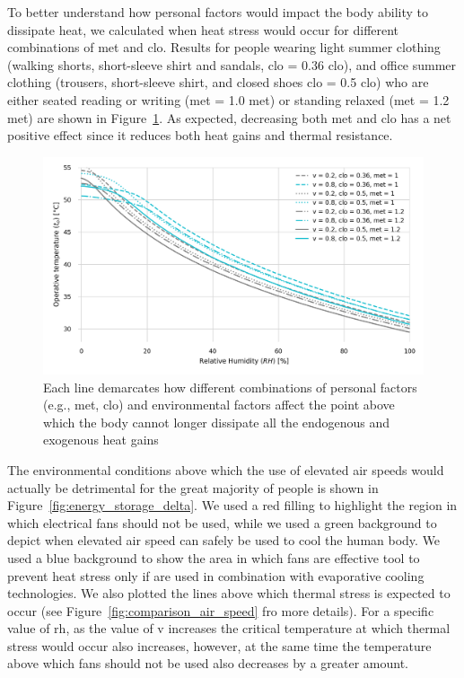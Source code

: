 To better understand how personal factors would impact the body ability to dissipate heat, we calculated when heat stress would occur for different combinations of \ac{met} and \ac{clo}.
Results for people wearing light summer clothing (walking shorts, short-sleeve shirt and sandals, \acs{clo} = 0.36 clo), and office summer clothing (trousers, short-sleeve shirt, and closed shoes \acs{clo} = 0.5 clo) who are either seated reading or writing (\ac{met} = 1.0 met) or standing relaxed (\ac{met} = 1.2 met) are shown in Figure~\ref{fig:met_clo}.
As expected, decreasing both \ac{met} and \ac{clo} has a net positive effect since it reduces both heat gains and thermal resistance.

\begin{figure}[thb!]
    \centering
    \includegraphics[width=\textwidth]{figures/met_clo}
    \caption{Each line demarcates how different combinations of personal factors (e.g., \ac{met}, \ac{clo}) and environmental factors affect the point above which the body cannot longer dissipate all the endogenous and exogenous heat gains}
    \label{fig:met_clo}
\end{figure}

The environmental conditions above which the use of elevated air speeds would actually be detrimental for the great majority of people is shown in Figure~\ref{fig:energy_storage_delta}.
We used a red filling to highlight the region in which electrical fans should not be used, while we used a green background to depict when elevated air speed can safely be used to cool the human body.
We used a blue background to show the area in which fans are effective tool to prevent heat stress only if are used in combination with evaporative cooling technologies.
We also plotted the lines above which thermal stress is expected to occur (see Figure~\ref{fig:comparison_air_speed} fro more details).
For a specific value of \ac{rh}, as the value of \ac{v} increases the critical temperature at which thermal stress would occur also increases, however, at the same time the temperature above which fans should not be used also decreases by a greater amount.

